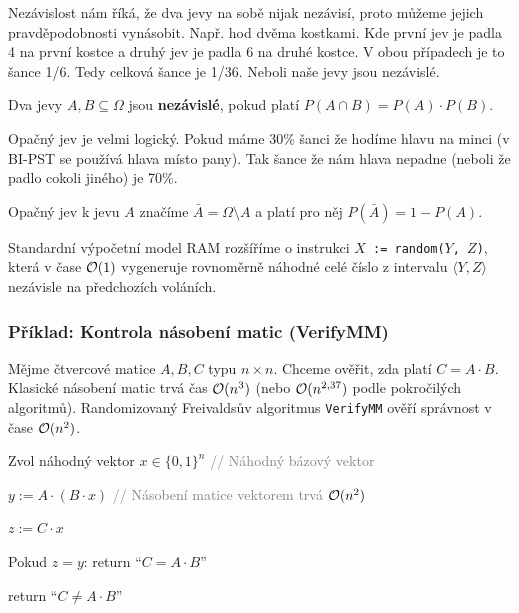\medskip

\noindent Nezávislost nám říká, že dva jevy na sobě nijak nezávisí, proto můžeme jejich pravděpodobnosti vynásobit. Např. hod dvěma kostkami. Kde první jev je padla 4 na první kostce a druhý jev je padla 6 na druhé kostce. V obou případech je to šance 1/6. Tedy celková šance je 1/36. Neboli naše jevy jsou nezávislé.

\begin{definition}
Dva jevy $A, B \subseteq \Omega$ jsou \textbf{nezávislé}, pokud platí $P(A \cap B) = P(A) \cdot P(B)$.
\end{definition}

\medskip

\noindent Opačný jev je velmi logický. Pokud máme 30\% šanci že hodíme hlavu na minci (v BI-PST se používá hlava místo pany). Tak šance že nám hlava nepadne (neboli že padlo cokoli jiného) je 70\%.

\begin{definition}
Opačný jev k jevu $A$ značíme $\bar{A} = \Omega \setminus A$ a platí pro něj $P(\bar{A}) = 1 - P(A)$.
\end{definition}

\medskip

\begin{definition}
Standardní výpočetní model RAM rozšíříme o instrukci \texttt{$X$ := random($Y$, $Z$)}, která v čase $\mathcal{O}(1)$ vygeneruje rovnoměrně náhodné celé číslo z intervalu $\langle Y, Z \rangle$ nezávisle na předchozích voláních.
\end{definition}

\subsubsection{Příklad: Kontrola násobení matic (VerifyMM)}

Mějme čtvercové matice $A, B, C$ typu $n \times n$. Chceme ověřit, zda platí $C = A \cdot B$. Klasické násobení matic trvá čas $\mathcal{O}(n^3)$ (nebo $\mathcal{O}(n^{2{,}37})$ podle pokročilých algoritmů). Randomizovaný Freivaldsův algoritmus \texttt{VerifyMM} ověří správnost v čase $\mathcal{O}(n^2)$.

\bigskip
{}
\begin{pseudocode}
\item Zvol náhodný vektor $x \in \{0, 1\}^n$ \textcolor{gray}{// Náhodný bázový vektor}
\item $y := A \cdot (B \cdot x)$ \textcolor{gray}{// Násobení matice vektorem trvá $\mathcal{O}(n^2)$}
\item $z := C \cdot x$
\item Pokud $z = y$: return ``$C = A \cdot B$''
\item return ``$C \neq A \cdot B$''
\end{pseudocode}
\bigskip

